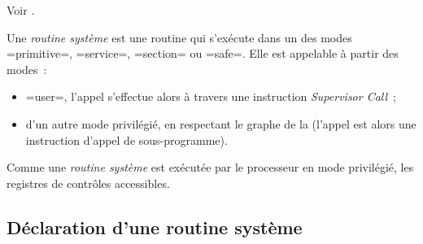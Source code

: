 
Voir .

%
%
%
%




















Une \emph{routine système} est une routine qui s'exécute dans un des modes \plm=primitive=, \plm=service=, \plm=section= ou \plm=safe=. Elle est appelable à partir des modes~:
\begin{itemize}
 \item \plm=user=, l'appel s'effectue alors à travers une instruction \emph{Supervisor Call}~;
  \item d'un autre mode privilégié, en respectant le graphe de la  (l'appel est alors une instruction d'appel de sous-programme).
\end{itemize}

Comme une \emph{routine système} est exécutée par le processeur en mode privilégié, les registres de contrôles accessibles.




\subsection{Déclaration d'une routine système}


